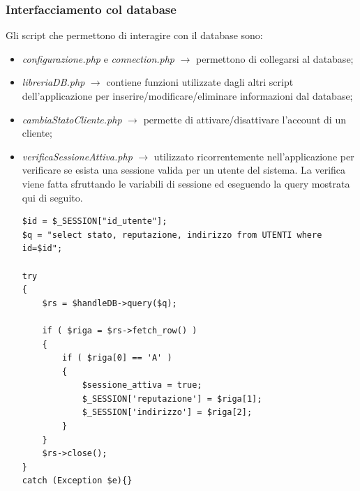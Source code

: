 \documentclass[a4paper, 14pt]{article}
\begin{document}
\begin{flushleft}
			\subsubsection{Interfacciamento col database}
			Gli script che permettono di interagire con il database sono:
				\begin{itemize}
					\item \textit{configurazione.php} e \textit{connection.php} $\rightarrow$ permettono di collegarsi al database;
					\item \textit{libreriaDB.php} $\rightarrow$ contiene funzioni utilizzate dagli altri script dell'applicazione per
																inserire/modificare/eliminare informazioni dal database;
					\item \textit{cambiaStatoCliente.php} $\rightarrow$ permette di attivare/disattivare l'account di un cliente;
					\item \textit{verificaSessioneAttiva.php} $\rightarrow$ utilizzato ricorrentemente nell'applicazione per verificare
						se esista una sessione valida per un utente del sistema. La verifica viene fatta sfruttando le variabili di sessione ed eseguendo la query mostrata qui di seguito.
						\begin{lstlisting}[backgroundcolor=\color{coloreSfondoGrammatiche}]
$id = $_SESSION["id_utente"];
$q = "select stato, reputazione, indirizzo from UTENTI where id=$id"; 

try
{
	$rs = $handleDB->query($q);
	
	if ( $riga = $rs->fetch_row() ) 
	{
		if ( $riga[0] == 'A' )
		{
			$sessione_attiva = true;
			$_SESSION['reputazione'] = $riga[1];
			$_SESSION['indirizzo'] = $riga[2];
		}
	}
	$rs->close();
}
catch (Exception $e){}
						\end{lstlisting}	
				\end{itemize}
		

\end{flushleft}
\end{document}
